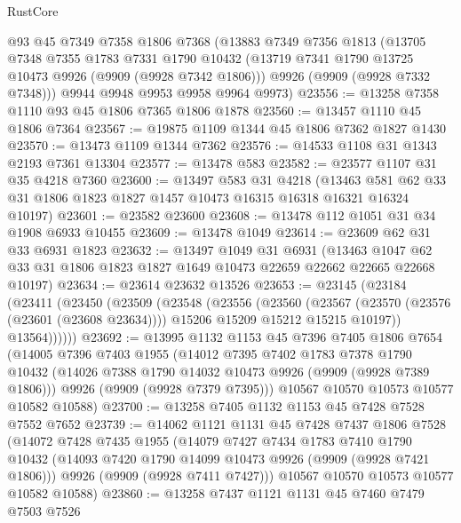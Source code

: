 \begin{lexlean}{RustCore}
\begin{coremodule}
    @93
    @45
    @7349
    @7358
    @1806
    @7368
    (@13883
      @7349
      @7356
      @1813
      (@13705
        @7348
        @7355
        @1783
        @7331
        @1790
        @10432
        (@13719 @7341 @1790 @13725 @10473 @9926 (@9909 (@9928 @7342 @1806)))
        @9926
        (@9909 (@9928 @7332 @7348)))
      @9944
      @9948
      @9953
      @9958
      @9964
      @9973)
@23556 := @13258 @7358 @1110 @93 @45 @1806 @7365 @1806 @1878
@23560 := @13457 @1110 @45 @1806 @7364
@23567 := @19875 @1109 @1344 @45 @1806 @7362 @1827 @1430
@23570 := @13473 @1109 @1344 @7362
@23576 := @14533 @1108 @31 @1343 @2193 @7361 @13304
@23577 := @13478 @583
@23582 := @23577 @1107 @31 @35 @4218 @7360
@23600 := @13497
    @583
    @31
    @4218
    (@13463 @581 @62 @33 @31 @1806 @1823 @1827 @1457 @10473 @16315 @16318 @16321 @16324 @10197)
@23601 := @23582 @23600
@23608 := @13478 @112 @1051 @31 @34 @1908 @6933 @10455
@23609 := @13478 @1049
@23614 := @23609 @62 @31 @33 @6931 @1823
@23632 := @13497
    @1049
    @31
    @6931
    (@13463 @1047 @62 @33 @31 @1806 @1823 @1827 @1649 @10473 @22659 @22662 @22665 @22668 @10197)
@23634 := @23614 @23632 @13526
@23653 := @23145
    (@23184
      (@23411
        (@23450
          (@23509
            (@23548
              (@23556
                (@23560
                  (@23567
                    (@23570 (@23576 (@23601 (@23608 @23634))))
                    @15206
                    @15209
                    @15212
                    @15215
                    @10197))
                @13564))))))
@23692 := @13995
    @1132
    @1153
    @45
    @7396
    @7405
    @1806
    @7654
    (@14005
      @7396
      @7403
      @1955
      (@14012
        @7395
        @7402
        @1783
        @7378
        @1790
        @10432
        (@14026 @7388 @1790 @14032 @10473 @9926 (@9909 (@9928 @7389 @1806)))
        @9926
        (@9909 (@9928 @7379 @7395)))
      @10567
      @10570
      @10573
      @10577
      @10582
      @10588)
@23700 := @13258 @7405 @1132 @1153 @45 @7428 @7528 @7552 @7652
@23739 := @14062
    @1121
    @1131
    @45
    @7428
    @7437
    @1806
    @7528
    (@14072
      @7428
      @7435
      @1955
      (@14079
        @7427
        @7434
        @1783
        @7410
        @1790
        @10432
        (@14093 @7420 @1790 @14099 @10473 @9926 (@9909 (@9928 @7421 @1806)))
        @9926
        (@9909 (@9928 @7411 @7427)))
      @10567
      @10570
      @10573
      @10577
      @10582
      @10588)
@23860 := @13258
    @7437
    @1121
    @1131
    @45
    @7460
    @7479
    @7503
    @7526

\end{coremodule}
\end{lexlean}
